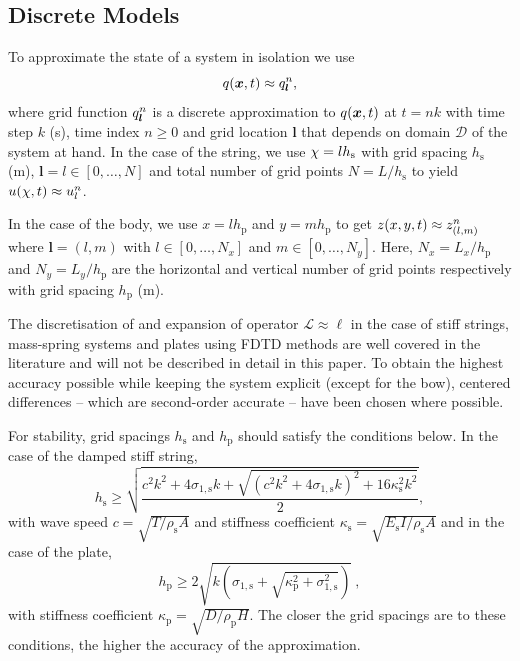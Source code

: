     \subsection{Discrete Models}
    To approximate the state of a system in isolation we use
    \begin{equation}\label{eq:generalDisc}
        q(\boldsymbol{x},t) \approx q^n_{\boldsymbol{l}}, 
    \end{equation} 
    where grid function $q^n_{\boldsymbol{l}}$ is a discrete approximation to $q({\boldsymbol{x}},t)$ at $t=nk$ with time step $k$ (s), time index $n\geq 0$ and grid location $\boldsymbol{l}$ that depends on domain $\mathcal{D}$ of the system at hand. In the case of the string, we use $\chi=lh_\text{s}$ with grid spacing $h_\text{s}$ (m), $\boldsymbol{l} = l \in [0,\hdots, N]$ and total number of grid points $N=L/h_\text{s}$ to yield $u(\chi,t) \approx u_l^n$.
    
    In the case of the body, we use $x=lh_\text{p}$ and $y=mh_\text{p}$ to get $z(x, y, t) \approx z_{(l,m)}^n$ where $\boldsymbol{l} = (l,m)$ with $l\in[0,\hdots,N_x]$ and $m\in[0,\hdots,N_y]$. Here, $N_x = L_x / h_\text{p}$ and $N_y = L_y / h_\text{p}$ are the horizontal and vertical number of grid points respectively with grid spacing $h_\text{p}$ (m).
    
     
    The discretisation of and expansion of operator $\mathcal{L}\approx \ell$ in the case of stiff strings, mass-spring systems and plates using FDTD methods are well covered in the literature \cite{bilbao2009numerical} and will not be described in detail in this paper. To obtain the highest accuracy possible while keeping the system explicit (except for the bow), centered differences -- which are second-order accurate -- have been chosen where possible. 
    
    For stability, grid spacings $h_\text{s}$ and $h_\text{p}$ should satisfy the conditions below. In the case of the damped stiff string,
    \begin{equation}
        h_\text{s} \geq \sqrt{\frac{c^2k^2+4\sigma_{1,\text{s}}k+\sqrt{(c^2k^2+4\sigma_{1,\text{s}}k)^2+16\kappa_\text{s}^2k^2}}{2}},
    \end{equation}
    with wave speed $c = \sqrt{T/\rho_\text{s}A}$ and stiffness coefficient $\kappa_\text{s} = \sqrt{E_\text{s}I/\rho_\text{s}A}$ and in the case of the plate,
    \begin{equation}\label{eq:gridSpacingPlate}
        h_\text{p} \geq 2\sqrt{k\left(\sigma_{1,\text{s}} + \sqrt{\kappa_\text{p}^2 + \sigma_{1,\text{s}}^2}\right)}\ ,
    \end{equation}
    with stiffness coefficient $\kappa_\text{p} = \sqrt{D/\rho_\text{p}H}$. The closer the grid spacings are to these conditions, the higher the accuracy of the approximation. 
    
